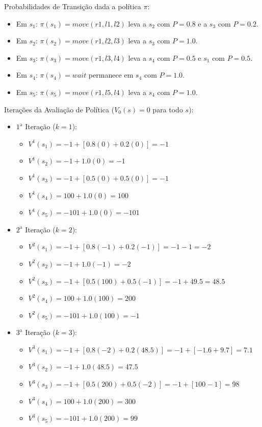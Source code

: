 \documentclass[a4paper,12pt]{article}
\begin{document}
Probabilidades de Transição dada a política $\pi$:
\begin{itemize}
	\item Em $s_1$: $\pi(s_1) = move(r1, l1, l2)$ leva a $s_2$ com $P=0.8$ e a $s_3$ com $P=0.2$.
	\item Em $s_2$: $\pi(s_2) = move(r1, l2, l3)$ leva a $s_3$ com $P=1.0$.
	\item Em $s_3$: $\pi(s_3) = move(r1, l3, l4)$ leva a $s_4$ com $P=0.5$ e $s_1$ com $P=0.5$.
	\item Em $s_4$: $\pi(s_4) = wait$ permanece em $s_4$ com $P=1.0$.
	\item Em $s_5$: $\pi(s_5) = move(r1, l5, l4)$ leva a $s_4$ com $P=1.0$.  \\
\end{itemize}


Iterações da Avaliação de Política ($V_0(s) = 0$ para todo $s$):
\begin{itemize}
	\item $1^{\text{a}}$ Iteração ($k=1$):
	\begin{itemize}
		\item $V^1(s_1) = -1 + [0.8(0) + 0.2(0)] = -1$
		\item $V^1(s_2) = -1 + 1.0(0) = -1$
		\item $V^1(s_3) = -1 + [0.5(0) + 0.5(0)] = -1$ 
		\item $V^1(s_4) = 100 + 1.0(0) = 100$
		\item $V^1(s_5) = -101 + 1.0(0) = -101$
	\end{itemize}
	\item $2^{\text{a}}$ Iteração ($k=2$):
	\begin{itemize}
		\item $V^2(s_1) = -1 + [0.8(-1) + 0.2(-1)] = -1 - 1 = -2$
		\item $V^2(s_2) = -1 + 1.0(-1) = -2$ 
		\item $V^2(s_3) = -1 + [0.5(100) + 0.5(-1)] = -1 + 49.5 = 48.5$
		\item $V^2(s_4) = 100 + 1.0(100) = 200$
		\item $V^2(s_5) = -101 + 1.0(100) = -1$
	\end{itemize}
	\item $3^{\text{a}}$ Iteração ($k=3$):
	\begin{itemize}
		\item $V^3(s_1) = -1 + [0.8(-2) + 0.2(48.5)] = -1 + [-1.6 + 9.7] = 7.1$
		\item $V^3(s_2) = -1 + 1.0(48.5) = 47.5$
		\item $V^3(s_3) = -1 + [0.5(200) + 0.5(-2)] = -1 + [100 - 1] = 98$
		\item $V^3(s_4) = 100 + 1.0(200) = 300$
		\item $V^3(s_5) = -101 + 1.0(200) = 99$
	\end{itemize}
\end{itemize}
                          
\end{document}
